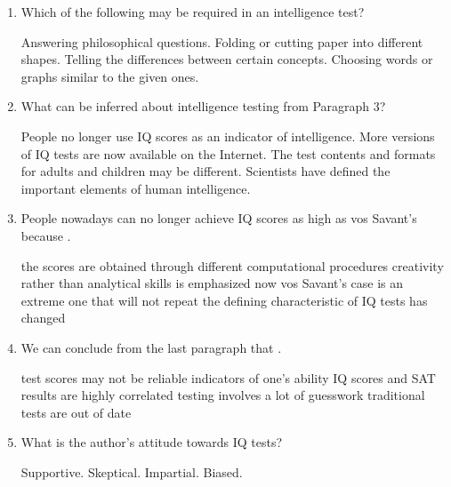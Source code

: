 \begin{enumerate}[resume]
	\item
Which of the following may be required in an intelligence
test?


\fourchoices
{Answering philosophical questions.}
{Folding or cutting paper into different shapes.}
{Telling the differences between certain concepts.}
{Choosing words or graphs similar to the given ones.}



\item
What can be inferred about intelligence testing from
Paragraph 3?


\fourchoices
{People no longer use IQ scores as an indicator of intelligence.}
{More versions of IQ tests are now available on the Internet.}
{The test contents and formats for adults and children may be different.}
{Scientists have defined the important elements of human intelligence.}



\item
People nowadays can no longer achieve IQ scores as high as
vos Savant's because  \lineread.


\fourchoices
{the scores are obtained through different computational procedures}
{creativity rather than analytical skills is emphasized now}
{vos Savant's case is an extreme one that will not repeat}
{the defining characteristic of IQ tests has changed}



\item
We can conclude from the last paragraph that \lineread.


\fourchoices
{test scores may not be reliable indicators of one's ability}
{IQ scores and SAT results are highly correlated}
{testing involves a lot of guesswork}
{traditional tests are out of date}


\item
What is the author's attitude towards IQ tests?


\fourchoices
{Supportive.}
{Skeptical.}
{Impartial.}
{Biased.}


\end{enumerate}



\newpage
